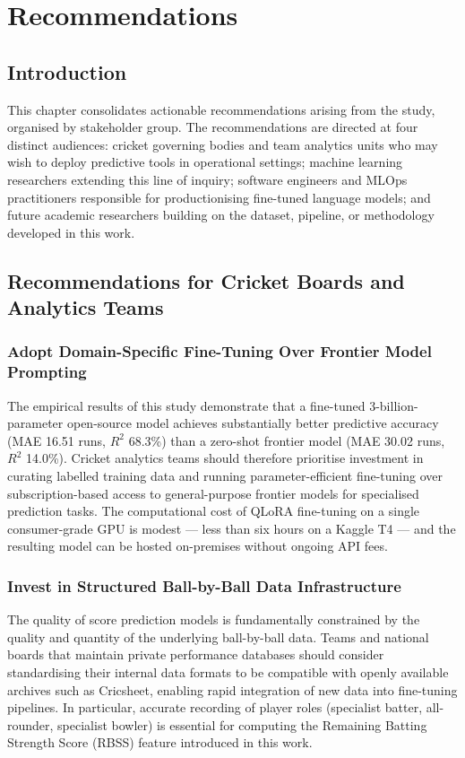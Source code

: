 \chapter{Recommendations}

\section{Introduction}

This chapter consolidates actionable recommendations arising from the study, organised by stakeholder group. The recommendations are directed at four distinct audiences: cricket governing bodies and team analytics units who may wish to deploy predictive tools in operational settings; machine learning researchers extending this line of inquiry; software engineers and MLOps practitioners responsible for productionising fine-tuned language models; and future academic researchers building on the dataset, pipeline, or methodology developed in this work.

\section{Recommendations for Cricket Boards and Analytics Teams}

\subsection{Adopt Domain-Specific Fine-Tuning Over Frontier Model Prompting}

The empirical results of this study demonstrate that a fine-tuned 3-billion-parameter open-source model achieves substantially better predictive accuracy (MAE 16.51 runs, $R^2$ 68.3\%) than a zero-shot frontier model (MAE 30.02 runs, $R^2$ 14.0\%). Cricket analytics teams should therefore prioritise investment in curating labelled training data and running parameter-efficient fine-tuning over subscription-based access to general-purpose frontier models for specialised prediction tasks. The computational cost of QLoRA fine-tuning on a single consumer-grade GPU is modest --- less than six hours on a Kaggle T4 --- and the resulting model can be hosted on-premises without ongoing API fees.

\subsection{Invest in Structured Ball-by-Ball Data Infrastructure}

The quality of score prediction models is fundamentally constrained by the quality and quantity of the underlying ball-by-ball data. Teams and national boards that maintain private performance databases should consider standardising their internal data formats to be compatible with openly available archives such as Cricsheet, enabling rapid integration of new data into fine-tuning pipelines. In particular, accurate recording of player roles (specialist batter, all-rounder, specialist bowler) is essential for computing the Remaining Batting Strength Score (RBSS) feature introduced in this work.

